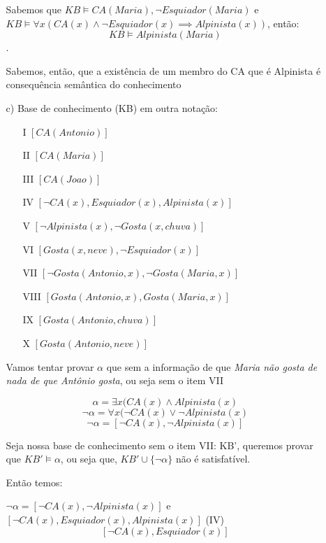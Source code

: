 \documentclass{article}
\begin{document}
\begin{enumerate}
\begin{itemize}
            Sabemos que $KB \vDash CA (Maria), \neg Esquiador(Maria)$ e $KB \vDash \forall x (CA(x) \land \neg Esquiador(x) \implies Alpinista(x))$,
            então: $$KB \vDash Alpinista(Maria)$$.

            Sabemos, então, que a existência de um membro do CA que é 
            Alpinista é consequência semântica do conhecimento

        \item [c)] Base de conhecimento (KB) em outra notação:
        
            \begin{itemize}
                \item [I] $[CA (Antonio)]$
                \item [II] $[CA (Maria)]$
                \item [III] $[CA (Joao)]$
                \item [IV] $[\neg CA(x), Esquiador(x), Alpinista(x)]$
                \item [V] $[\neg Alpinista(x), \neg Gosta(x, chuva)]$
                \item [VI] $[Gosta(x, neve), \neg Esquiador (x)]$
                \item [VII] $[\neg Gosta (Antonio,x), \neg Gosta (Maria,x)]$
                \item [VIII] $[Gosta (Antonio,x), Gosta (Maria,x)]$
                \item [IX] $[Gosta(Antonio, chuva)]$
                \item [X] $[Gosta(Antonio, neve)]$

            \end{itemize}
        
        Vamos tentar provar $\alpha$ que sem a informação de que \textit{Maria não gosta de nada de que Antônio gosta},
        ou seja sem o item VII

        $$\alpha = \exists x (CA(x) \land Alpinista(x)$$
        $$\neg \alpha = \forall x (\neg CA(x) \lor \neg Alpinista(x)$$
        $$\neg \alpha = [\neg CA(x), \neg Alpinista(x)]$$

        Seja nossa base de conhecimento sem o item VII: KB', queremos provar que
        $KB' \vDash \alpha$, ou seja que, $KB' \cup \{\neg \alpha\}$ não é 
        satisfatível.

        Então temos:

        $\neg \alpha = [\neg CA(x), \neg Alpinista(x)]$ e $[\neg CA(x), Esquiador(x), Alpinista(x)]$ (IV)
        $$[\neg CA(x), Esquiador(x)]$$


\end{itemize}
\end{enumerate}
\end{document}
